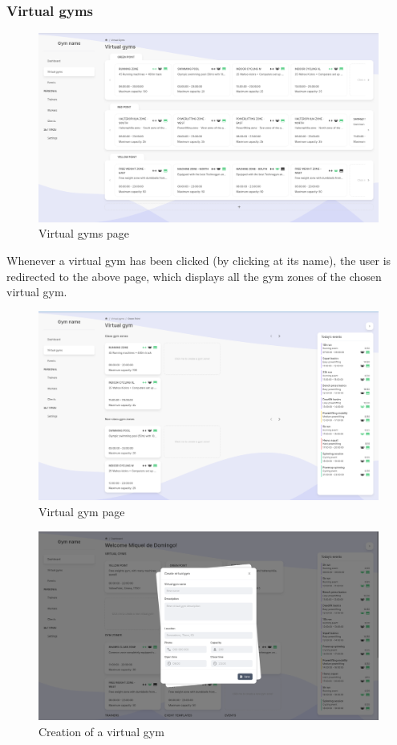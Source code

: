 \documentclass[a4paper, 12pt, oneside]{book}
\begin{document}
\subsubsection{Virtual gyms}
\begin{figure}[H]
	\centering
	\includegraphics[width=\textwidth]{assets/core-screenshots/virtual-gyms.png}
	\caption{Virtual gyms page}
\end{figure}
Whenever a virtual gym has been clicked (by clicking at its name), the user is redirected to the above page, which displays all the gym zones of the chosen virtual gym.
\begin{figure}[H]
	\centering
	\includegraphics[width=\textwidth]{assets/core-screenshots/virtual-gym.png}
	\caption{Virtual gym page}
\end{figure}
\begin{figure}[H]
	\centering
	\includegraphics[width=\textwidth]{assets/core-screenshots/create-virtual-gym.png}
	\caption{Creation of a virtual gym}
\end{figure}
\end{document}
